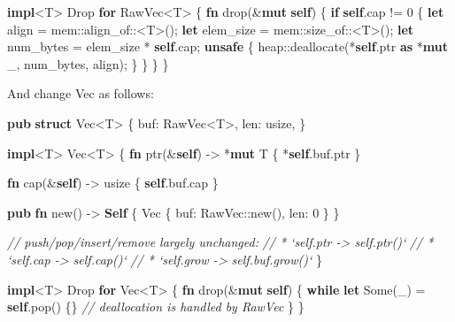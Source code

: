\documentclass[a4paper,]{book}
\newenvironment{Shaded}{\begin{snugshade}}{\end{snugshade}}
\newcommand{\KeywordTok}[1]{\textcolor[rgb]{0.13,0.29,0.53}{\textbf{{#1}}}}
\newcommand{\DataTypeTok}[1]{\textcolor[rgb]{0.13,0.29,0.53}{{#1}}}
\newcommand{\DecValTok}[1]{\textcolor[rgb]{0.00,0.00,0.81}{{#1}}}
\newcommand{\ConstantTok}[1]{\textcolor[rgb]{0.00,0.00,0.00}{{#1}}}
\newcommand{\CommentTok}[1]{\textcolor[rgb]{0.56,0.35,0.01}{\textit{{#1}}}}
\newcommand{\BuiltInTok}[1]{{#1}}
\newcommand{\NormalTok}[1]{{#1}}
\begin{document}
\begin{Shaded}
\begin{Highlighting}[]
\KeywordTok{impl}\NormalTok{<T> }\BuiltInTok{Drop} \KeywordTok{for} \NormalTok{RawVec<T> \{}
    \KeywordTok{fn} \NormalTok{drop(&}\KeywordTok{mut} \KeywordTok{self}\NormalTok{) \{}
        \KeywordTok{if} \KeywordTok{self}\NormalTok{.cap != }\DecValTok{0} \NormalTok{\{}
            \KeywordTok{let} \NormalTok{align = mem::align_of::<T>();}
            \KeywordTok{let} \NormalTok{elem_size = mem::size_of::<T>();}
            \KeywordTok{let} \NormalTok{num_bytes = elem_size * }\KeywordTok{self}\NormalTok{.cap;}
            \KeywordTok{unsafe} \NormalTok{\{}
                \NormalTok{heap::deallocate(*}\KeywordTok{self}\NormalTok{.ptr }\KeywordTok{as} \NormalTok{*}\KeywordTok{mut} \NormalTok{_, num_bytes, align);}
            \NormalTok{\}}
        \NormalTok{\}}
    \NormalTok{\}}
\NormalTok{\}}
\end{Highlighting}
\end{Shaded}

And change Vec as follows:

\begin{Shaded}
\begin{Highlighting}[]
\KeywordTok{pub} \KeywordTok{struct} \DataTypeTok{Vec}\NormalTok{<T> \{}
    \NormalTok{buf: RawVec<T>,}
    \NormalTok{len: }\DataTypeTok{usize}\NormalTok{,}
\NormalTok{\}}

\KeywordTok{impl}\NormalTok{<T> }\DataTypeTok{Vec}\NormalTok{<T> \{}
    \KeywordTok{fn} \NormalTok{ptr(&}\KeywordTok{self}\NormalTok{) -> *}\KeywordTok{mut} \NormalTok{T \{ *}\KeywordTok{self}\NormalTok{.buf.ptr \}}

    \KeywordTok{fn} \NormalTok{cap(&}\KeywordTok{self}\NormalTok{) -> }\DataTypeTok{usize} \NormalTok{\{ }\KeywordTok{self}\NormalTok{.buf.cap \}}

    \KeywordTok{pub} \KeywordTok{fn} \NormalTok{new() -> }\KeywordTok{Self} \NormalTok{\{}
        \DataTypeTok{Vec} \NormalTok{\{ buf: RawVec::new(), len: }\DecValTok{0} \NormalTok{\}}
    \NormalTok{\}}

    \CommentTok{// push/pop/insert/remove largely unchanged:}
    \CommentTok{// * `self.ptr -> self.ptr()`}
    \CommentTok{// * `self.cap -> self.cap()`}
    \CommentTok{// * `self.grow -> self.buf.grow()`}
\NormalTok{\}}

\KeywordTok{impl}\NormalTok{<T> }\BuiltInTok{Drop} \KeywordTok{for} \DataTypeTok{Vec}\NormalTok{<T> \{}
    \KeywordTok{fn} \NormalTok{drop(&}\KeywordTok{mut} \KeywordTok{self}\NormalTok{) \{}
        \KeywordTok{while} \KeywordTok{let} \ConstantTok{Some}\NormalTok{(_) = }\KeywordTok{self}\NormalTok{.pop() \{\}}
        \CommentTok{// deallocation is handled by RawVec}
    \NormalTok{\}}
\NormalTok{\}}
\end{Highlighting}
\end{Shaded}
\end{document}
